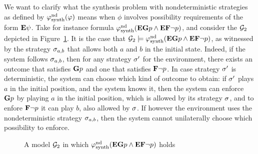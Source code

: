 We want to clarify what the synthesis problem with nondeterministic
strategies as defined by $\varphi^{\text{nd}}_{\text{synth}}(\varphi)$ means when $\phi$
involves possibility requirements of the form ${\bf E}\psi$.
Take for instance formula $\varphi^{\text{nd}}_{\text{synth}}({\bf E} {\bf G} p
  \wedge {\bf E} {\bf F} \neg p)$, and consider the \CGS $\CGS_2$ depicted in
  Figure~\ref{fig:exampleb}. It is the case that $\CGS_2\models\phisynthndet(\E \always p
  \wedge \E \F \neg p)$, as witnessed by the strategy $\sigma_{a,b}$ that allows both
  $a$ and $b$ in the initial state. Indeed, if the system follows
  $\sigma_{a,b}$, then for any strategy $\sigma'$ for the environment, there
  exists an outcome that satisfies ${\bf G} p$ and one that satisfies
  ${\bf F} \neg p$. In case strategy $\sigma'$ is deterministic, the system
  can choose which kind of outcome to obtain: if $\sigma'$ plays $a$
  in the initial position, and the system knows it, then the system
  can enforce ${\bf G} p$ by playing $a$ in the initial position, which is
  allowed by its strategy $\sigma$, and to enfore ${\bf F}\neg p$ it can
  play $b$, also allowed by $\sigma$. If however the environment
uses the nondeterministic  strategy $\sigma_{a,b}$, then the system cannot unilaterally choose
  which possibility to enforce.

\begin{figure}
  \centering
{}  
  \caption{A model $\CGS_2$ in which $\varphi^{\text{nd}}_{\text{synth}}({\bf E} {\bf G} p
  \wedge {\bf E} {\bf F} \neg p)$ holds}
  \label{fig:exampleb}
\end{figure}

